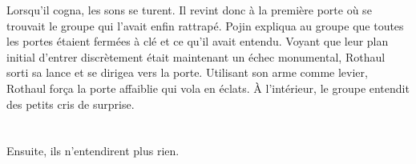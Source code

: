 \documentclass[main.tex]{subfiles}
\begin{document}
    Lorsqu'il cogna, les sons se turent.
    Il revint donc à la première porte où se trouvait le groupe qui l'avait enfin rattrapé.
    Pojin expliqua au groupe que toutes les portes étaient fermées à clé et ce qu'il avait entendu.
    Voyant que leur plan initial d'entrer discrètement était maintenant un échec monumental, Rothaul sorti sa lance et se dirigea vers la porte.
    Utilisant son arme comme levier, Rothaul força la porte affaiblie qui vola en éclats.
    À l'intérieur, le groupe entendit des petits cris de surprise.\\
    \\
    \\
    Ensuite, ils n'entendirent plus rien.
\end{document}
